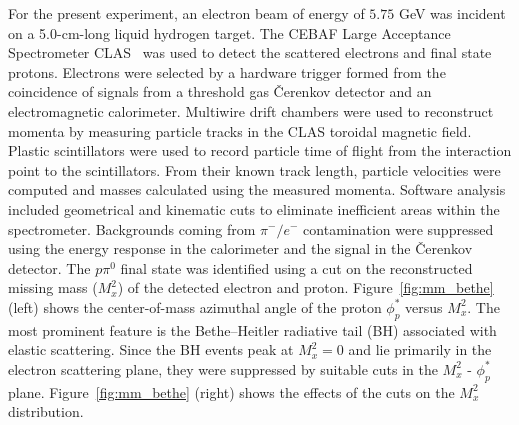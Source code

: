 \documentclass[aps,prl,twocolumn,superscriptaddress]{revtex4}
\newcommand{\F}[1]{Figure~\ref{#1}}
\begin{document}
For the present experiment, an electron beam of energy of $5.75$ GeV was 
incident on a 5.0-cm-long liquid hydrogen target. The CEBAF Large 
Acceptance Spectrometer CLAS~\cite{bib:clas} was used to detect the 
scattered electrons and final state protons. Electrons were selected by 
a hardware trigger formed from the coincidence of signals from a threshold 
gas \v{C}erenkov detector and an electromagnetic calorimeter. Multiwire 
drift chambers were used to reconstruct momenta by measuring particle tracks 
in the CLAS toroidal magnetic field. Plastic scintillators were used to 
record particle time of flight from the interaction point to the 
scintillators.  From their known track length, particle velocities were 
computed and masses calculated using the measured momenta. Software analysis
included geometrical and kinematic cuts to eliminate inefficient areas within 
the spectrometer. Backgrounds coming from $\pi^-/e^-$ contamination were 
suppressed using the energy response in the calorimeter and the signal in the
\v{C}erenkov detector. The  $p\pi^0$ final state was identified using a cut on
the reconstructed missing mass ($M_x^2$) of the detected electron and proton. 
\F{fig:mm_bethe} (left) shows the center-of-mass azimuthal angle of the 
proton $\phi^*_p$ versus $M_x^2$. The most prominent feature is the 
Bethe--Heitler radiative tail (BH) associated with elastic scattering. 
Since the BH events  peak at $M_x^2=0$ and lie primarily in the electron 
scattering plane, they were suppressed by suitable cuts in the 
$M_x^2 $ - $\phi^*_p$  plane. \F{fig:mm_bethe} (right) shows the effects 
of the cuts on the $M_x^2 $ distribution.
\end{document}
